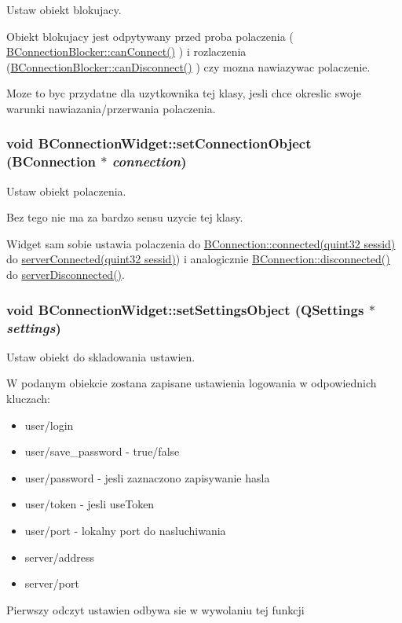 Ustaw obiekt blokujacy. 

Obiekt blokujacy jest odpytywany przed proba polaczenia ( \hyperlink{class_b_connection_blocker_2ebcdef0e5570c7331036dd5b6ba4448}{BConnectionBlocker::canConnect()} ) i rozlaczenia (\hyperlink{class_b_connection_blocker_81e8782c93ac1943a7e19b4ed7ced792}{BConnectionBlocker::canDisconnect()} ) czy mozna nawiazywac polaczenie.

Moze to byc przydatne dla uzytkownika tej klasy, jesli chce okreslic swoje warunki nawiazania/przerwania polaczenia. \hypertarget{class_b_connection_widget_476033357eea69f9ef4a7f4235a97556}{
\subsubsection[{setConnectionObject}]{\setlength{\rightskip}{0pt plus 5cm}void BConnectionWidget::setConnectionObject ({\bf BConnection} $\ast$ {\em connection})}}
\label{class_b_connection_widget_476033357eea69f9ef4a7f4235a97556}


Ustaw obiekt polaczenia. 

Bez tego nie ma za bardzo sensu uzycie tej klasy.

Widget sam sobie ustawia polaczenia do \hyperlink{class_b_connection_90dca3f0343427e31bb4544a8accf56d}{BConnection::connected(quint32 sessid)} do \hyperlink{class_b_connection_widget_7c9d3a266939c6719fe198f9b3d67636}{serverConnected(quint32 sessid)}) i analogicznie \hyperlink{class_b_connection_20fa85863f4cb396d3141e01d4928fd4}{BConnection::disconnected()} do \hyperlink{class_b_connection_widget_159829b06e46c68a354ec999d4b15b61}{serverDisconnected()}. \hypertarget{class_b_connection_widget_45070066f5da8af537f422d8b37c7d6e}{
\subsubsection[{setSettingsObject}]{\setlength{\rightskip}{0pt plus 5cm}void BConnectionWidget::setSettingsObject (QSettings $\ast$ {\em settings})}}
\label{class_b_connection_widget_45070066f5da8af537f422d8b37c7d6e}


Ustaw obiekt do skladowania ustawien. 

W podanym obiekcie zostana zapisane ustawienia logowania w odpowiednich kluczach: \begin{itemize}
\item user/login \item user/save\_\-password - true/false \item user/password - jesli zaznaczono zapisywanie hasla \item user/token - jesli useToken \item user/port - lokalny port do nasluchiwania \item server/address \item server/port\end{itemize}
Pierwszy odczyt ustawien odbywa sie w wywolaniu tej funkcji


